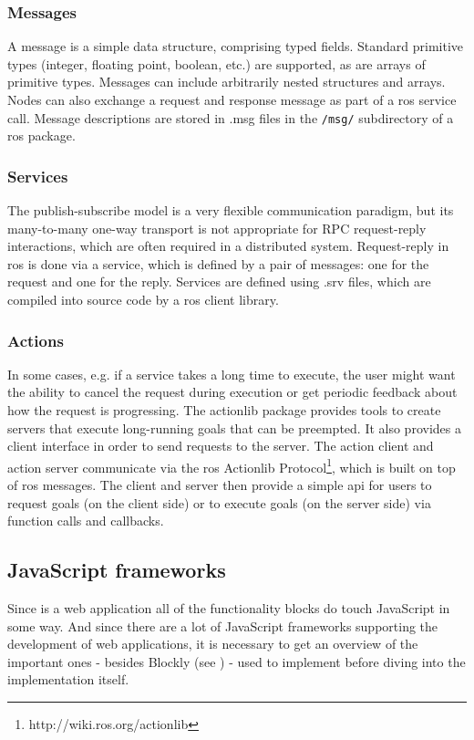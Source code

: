 \subsubsection{Messages}
A message is a simple data structure, comprising typed fields. Standard primitive types (integer, floating point, boolean, etc.) are supported, as are arrays of primitive types. Messages can include arbitrarily nested structures and arrays. Nodes can also exchange a request and response message as part of a \gls{ros} service call. Message descriptions are stored in .msg files in the \lstinline!/msg/! subdirectory of a \gls{ros} package.

\subsubsection{Services}
The publish-subscribe model is a very flexible communication paradigm, but its many-to-many one-way transport is not appropriate for RPC request-reply interactions, which are often required in a distributed system. Request-reply in \gls{ros} is done via a service, which is defined by a pair of messages: one for the request and one for the reply. Services are defined using .srv files, which are compiled into source code by a \gls{ros} client library.

\subsubsection{Actions}
In some cases, e.g. if a service takes a long time to execute, the user might want the ability to cancel the request during execution or get periodic feedback about how the request is progressing. The actionlib package provides tools to create servers that execute long-running goals that can be preempted. It also provides a client interface in order to send requests to the server.
The action client and action server communicate via the \gls{ros} Actionlib Protocol\footnote{http://wiki.ros.org/actionlib}, which is built on top of \gls{ros} messages. The client and server then provide a simple \gls{api} for users to request goals (on the client side) or to execute goals (on the server side) via function calls and callbacks.

\subsection{JavaScript frameworks} \label{sub:jsFrameworks}
Since \toolname{} is a web application all of the functionality blocks do touch JavaScript in some way. And since there are a lot of JavaScript frameworks supporting the development of web applications, it is necessary to get an overview of the important ones - besides Blockly (see ) - used to implement \toolname{} before diving into the implementation itself.

